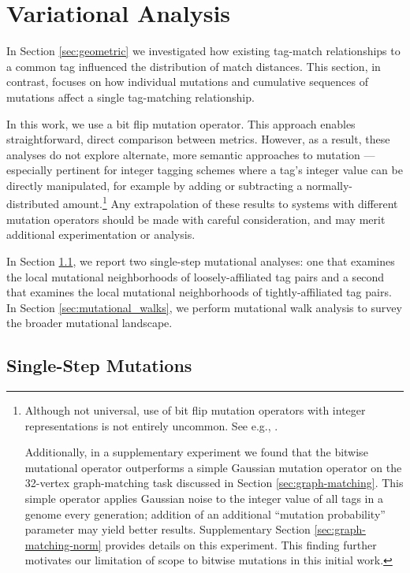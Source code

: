 \section{Variational Analysis} \label{sec:variational}

In Section \ref{sec:geometric} we investigated how existing tag-match relationships to a common tag influenced the distribution of match distances.
This section, in contrast, focuses on how individual mutations and cumulative sequences of mutations affect a single tag-matching relationship.

In this work, we use a bit flip mutation operator.
This approach enables straightforward, direct comparison between metrics.
However, as a result, these analyses do not explore alternate, more semantic approaches to mutation --- especially pertinent for integer tagging schemes where a tag's integer value can be directly manipulated, for example by adding or subtracting a normally-distributed amount.\footnote{
Although not universal, use of bit flip mutation operators with integer representations is not entirely uncommon.
See e.g., \cite{downing2015intelligence}.

Additionally, in a supplementary experiment we found that the bitwise mutational operator outperforms a simple Gaussian mutation operator on the 32-vertex graph-matching task discussed in Section \ref{sec:graph-matching}.
This simple operator applies Gaussian noise to the integer value of all tags in a genome every generation; addition of an additional ``mutation probability'' parameter may yield better results.
Supplementary Section \ref{sec:graph-matching-norm} provides details on this experiment.
This finding further motivates our limitation of scope to bitwise mutations in this initial work.
}
Any extrapolation of these results to systems with different mutation operators should be made with careful consideration, and may merit additional experimentation or analysis.

In Section \ref{sec:single_step}, we report two single-step mutational analyses: one that examines the local mutational neighborhoods of loosely-affiliated tag pairs and a second that examines the local mutational neighborhoods of tightly-affiliated tag pairs.
In Section \ref{sec:mutational_walks}, we perform mutational walk analysis to survey the broader mutational landscape.

\subsection{Single-Step Mutations} \label{sec:single_step}

